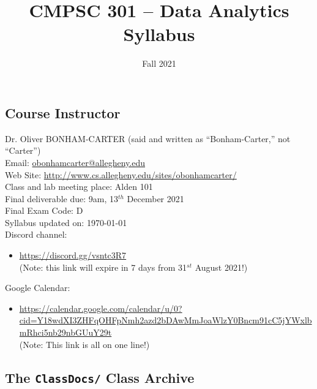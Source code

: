 \documentclass[11pt]{article} %
\title{\textbf{CMPSC 301 -- Data Analytics\\Syllabus}}
\author{Fall 2021}
\date{}
\begin{document}
\maketitle

\subsection*{\textbf{Course Instructor}}
Dr. Oliver BONHAM-CARTER (said and written as ``Bonham-Carter,'' not “Carter'')\\
\noindent Email: \url{obonhamcarter@allegheny.edu} \\
\noindent Web Site: \url{http://www.cs.allegheny.edu/sites/obonhamcarter/} \\
\noindent Class and lab meeting place: Alden 101\\
\noindent Final deliverable due: 9am, 13$^{th}$ December 2021\\ %
\noindent Final Exam Code: D\\  
\noindent Syllabus updated on: \today\\

\noindent Discord channel: 
\begin{itemize} 
	\item \url{https://discord.gg/vsntc3R7}\\ \color{red}(Note: this link will expire in 7 days from 31$^{st}$ August 2021!)\color{black}\\
\end{itemize}

\noindent Google Calendar:
\begin{itemize}
\item {\footnotesize \url{https://calendar.google.com/calendar/u/0?cid=Y18wdXI3ZHFqOHFpNmh2azd2bDAwMmJoaWlzY0Bncm91cC5jYWxlbmRhci5nb29nbGUuY29t}}\\\color{red}(Note: This link is all on one line!)\color{black}\\
\end{itemize}


\subsection*{The {\tt ClassDocs/} Class Archive}
\end{document}
